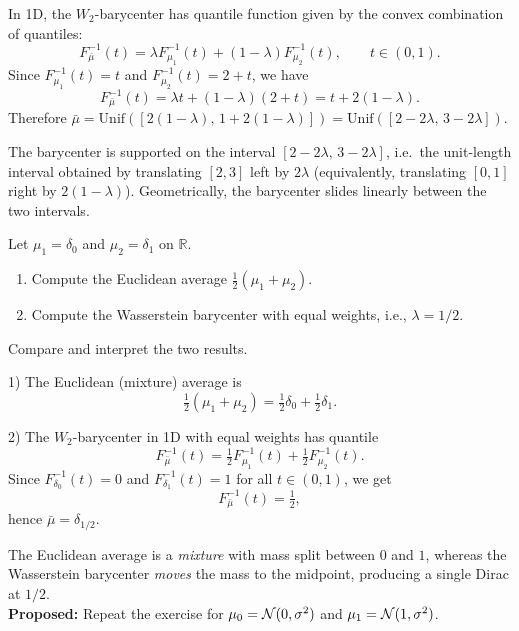 \begin{solution}
In 1D, the $W_2$-barycenter has quantile function given by the convex combination of quantiles:
\[
F_{\bar\mu}^{-1}(t)=\lambda F_{\mu_1}^{-1}(t)+(1-\lambda)F_{\mu_2}^{-1}(t),\qquad t\in(0,1).
\]
Since $F_{\mu_1}^{-1}(t)=t$ and $F_{\mu_2}^{-1}(t)=2+t$, we have
\[
F_{\bar\mu}^{-1}(t)=\lambda t+(1-\lambda)(2+t)=t+2(1-\lambda).
\]
Therefore $\bar\mu=\mathrm{Unif}([2(1-\lambda),\,1+2(1-\lambda)])=\mathrm{Unif}([2-2\lambda,\,3-2\lambda])$.

The barycenter is supported on the interval $[2-2\lambda,\,3-2\lambda]$, i.e.\ the unit-length interval obtained by translating
$[2,3]$ left by $2\lambda$ (equivalently, translating $[0,1]$ right by $2(1-\lambda)$). Geometrically, the barycenter
slides linearly between the two intervals.
\end{solution}




\begin{exercise}
Let $\mu_1=\delta_0$ and $\mu_2=\delta_1$ on $\mathbb{R}$.
\begin{enumerate}
\item Compute the Euclidean average $\tfrac12(\mu_1+\mu_2)$.
\item Compute the Wasserstein barycenter with equal weights, i.e., $\lambda = 1/2$.
\end{enumerate}
Compare and interpret the two results.
\end{exercise}


\begin{solution}
1) The Euclidean (mixture) average is
\[
\tfrac12(\mu_1+\mu_2)=\tfrac12\delta_0+\tfrac12\delta_1.
\]

2) The $W_2$-barycenter in 1D with equal weights has quantile
\[
F_{\bar\mu}^{-1}(t)=\tfrac12 F_{\mu_1}^{-1}(t)+\tfrac12 F_{\mu_2}^{-1}(t).
\]
Since $F_{\delta_0}^{-1}(t)=0$ and $F_{\delta_1}^{-1}(t)=1$ for all $t\in(0,1)$, we get
\[
F_{\bar\mu}^{-1}(t)=\tfrac12,
\]
hence $\bar\mu=\delta_{1/2}$.

The Euclidean average is a \emph{mixture} with mass split between $0$ and $1$,
whereas the Wasserstein barycenter \emph{moves} the mass to the midpoint, producing a single Dirac at $1/2$.\\
\textbf{Proposed:} Repeat the exercise for $\mu_0 = {\mathcal N}(0,\sigma^2)$ and $\mu_1 = {\mathcal N}(1,\sigma^2)$.
\end{solution}
